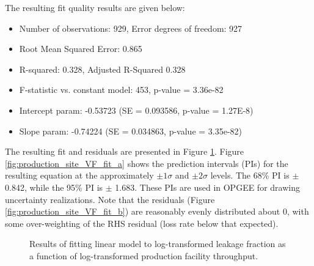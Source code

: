 \documentclass[11pt]{report}
\begin{document}
{{{{The resulting fit quality results are given below:
\begin{itemize}
\item Number of observations: 929, Error degrees of freedom: 927
\item Root Mean Squared Error: 0.865
\item R-squared: 0.328,  Adjusted R-Squared 0.328
\item F-statistic vs. constant model: 453, p-value = 3.36e-82
\item Intercept param: -0.53723 (SE = 0.093586, p-value = 1.27E-8)
\item Slope param: -0.74224 (SE = 0.034863, p-value = 3.35e-82)
\end{itemize}

The resulting fit and residuals are presented in Figure \ref{fig:production_site_VF_fit}. Figure \ref{fig:production_site_VF_fit_a} shows the prediction intervals (PIs) for the resulting equation at the approximately $\pm 1 \sigma$ and $\pm 2 \sigma$ levels. The 68\% PI is $\pm$ 0.842, while the 95\% PI is $\pm$ 1.683. These PIs are used in OPGEE for drawing uncertainty realizations. Note that the residuals (Figure \ref{fig:production_site_VF_fit_b}) are reasonably evenly distributed about 0, with some over-weighting of the RHS residual (loss rate below that expected).

\begin{figure}[tb]
\begin{center}
\hfill
{}
\hfill
\caption{Results of fitting linear model to log-transformed leakage fraction as a function of log-transformed production facility throughput.}
\label{fig:production_site_VF_fit}
\end{center}
\end{figure}


}}}}
\end{document}
